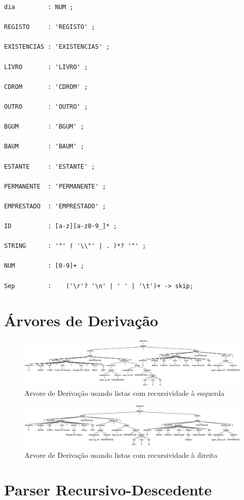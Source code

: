 \begin{verbatim}
dia         : NUM ;

REGISTO     : 'REGISTO' ;

EXISTENCIAS : 'EXISTENCIAS' ;

LIVRO       : 'LIVRO' ;

CDROM       : 'CDROM' ;

OUTRO       : 'OUTRO' ;

BGUM        : 'BGUM' ;

BAUM        : 'BAUM' ;

ESTANTE     : 'ESTANTE' ;

PERMANENTE  : 'PERMANENTE' ;

EMPRESTADO  : 'EMPRESTADO' ;

ID          : [a-z][a-z0-9_]* ;

STRING      : '"' ( '\\"' | . )*? '"' ;

NUM         : [0-9]+ ;

Sep         :    ('\r'? '\n' | ' ' | '\t')+ -> skip;

\end{verbatim}
\newpage
\section{Árvores de Derivação}
\begin{figure}[!h]
	\centering
    \includegraphics[angle = 90,height =0.95\paperwidth]{./imagens/alineaa.png}
    \caption{Arvore de Derivação usando listas com recursividade à esquerda}
    \label{fig:anexo_a}
\end{figure}
\begin{figure}[!h]
  \centering
    \includegraphics[angle = 90,height =0.95\paperwidth]{./imagens/alineac.png}
    \caption{Arvore de Derivação usando listas com recursividade à direita}
    \label{fig:anexo_a}
\end{figure}
\newpage
\section{Parser Recursivo-Descedente} %
\label{sec:parser_recursivo_descedente}

